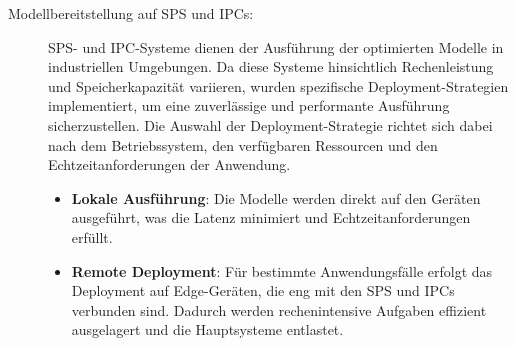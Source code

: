\begin{description}
    \item[Modellbereitstellung auf SPS und IPCs:] SPS- und IPC-Systeme dienen der Ausführung der optimierten Modelle in industriellen Umgebungen. 
    Da diese Systeme hinsichtlich Rechenleistung und Speicherkapazität variieren, wurden spezifische Deployment-Strategien implementiert, 
    um eine zuverlässige und performante Ausführung sicherzustellen. Die Auswahl der Deployment-Strategie richtet sich dabei nach dem Betriebssystem, 
    den verfügbaren Ressourcen und den Echtzeitanforderungen der Anwendung.
    \begin{itemize}
        \item \textbf{Lokale Ausführung}: Die Modelle werden direkt auf den Geräten ausgeführt, was die Latenz minimiert und Echtzeitanforderungen erfüllt.
        \item \textbf{Remote Deployment}: Für bestimmte Anwendungsfälle erfolgt das Deployment auf Edge-Geräten, die eng mit den SPS und IPCs verbunden sind. 
        Dadurch werden rechenintensive Aufgaben effizient ausgelagert und die Hauptsysteme entlastet.
    \end{itemize}


\end{description}
